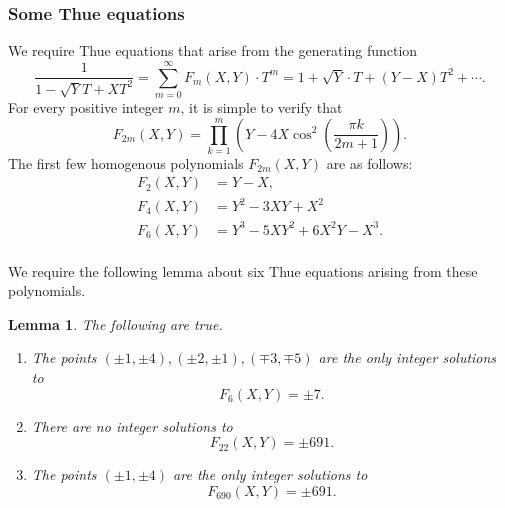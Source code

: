 \documentclass[12pt]{amsart}
\newtheorem{lem}{Lemma}[section]
\numberwithin{equation}{section}
\begin{document}
\subsubsection{Some Thue equations}
We require Thue equations that arise
from the generating function
\begin{equation}\label{genfunction}
\frac{1}{1-\sqrt{Y}T+XT^2}=\sum_{m=0}^{\infty}F_m(X,Y)\cdot T^{m}=1+\sqrt{Y}\cdot T+(Y-X)T^2+\cdots.
\end{equation}
For every positive integer $m$, it is simple to verify that
\begin{equation}\label{ThueEqn}
F_{2m}(X,Y)=\prod_{k=1}^m \left(Y-4X \cos^2\left(\frac{\pi k}{2m+1}\right)\right).
\end{equation}
The first few homogenous polynomials $F_{2m}(X,Y)$ are as follows:
\begin{displaymath}
\begin{split}
F_2(X,Y)&=Y-X,\\
F_4(X,Y)&=Y^2-3XY+X^2\\
F_6(X,Y)&=Y^3-5XY^2+6X^2Y-X^3.\\
\end{split}
\end{displaymath}

We require the following lemma about six Thue equations arising from these polynomials.
\begin{lem}\label{Monster} The following are true.
\begin{enumerate}
\item The points $(\pm 1, \pm 4), (\pm 2, \pm 1), (\mp3, \mp 5)$ are the only integer solutions to
$$
F_6(X,Y)=\pm 7.
$$
\item There are no integer solutions to
$$
F_{22}(X,Y)=\pm 691.
$$
\item The points $(\pm 1, \pm 4)$ are the only integer solutions to
$$
F_{690}(X,Y)=\pm 691.
$$
\end{enumerate}
\end{lem}
\end{document}
